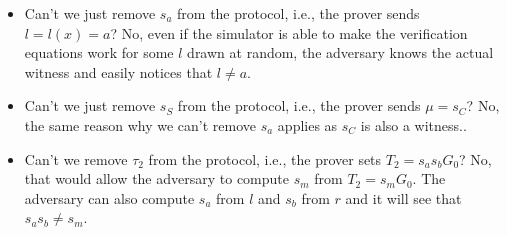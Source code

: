 \begin{itemize}
  \item Can't we just remove $s_a$ from the protocol, i.e., the prover sends $l = l(x) = a$? No, even if the simulator is able to make the verification equations work for some $l$ drawn at random, the adversary knows the actual witness and easily notices that $l \ne a$.
  \item Can't we just remove $s_S$ from the protocol, i.e., the prover sends $\mu = s_C$? No, the same reason why we can't remove $s_a$ applies as $s_C$ is also a witness..
  \item Can't we remove $\tau_2$ from the protocol, i.e., the prover sets $T_2 = s_as_bG_0$? No, that would allow the adversary to compute $s_m$ from $T_2 = s_mG_0$. The adversary can also compute $s_a$ from $l$ and $s_b$ from $r$ and it will see that $s_as_b \ne s_m$.
\end{itemize}

